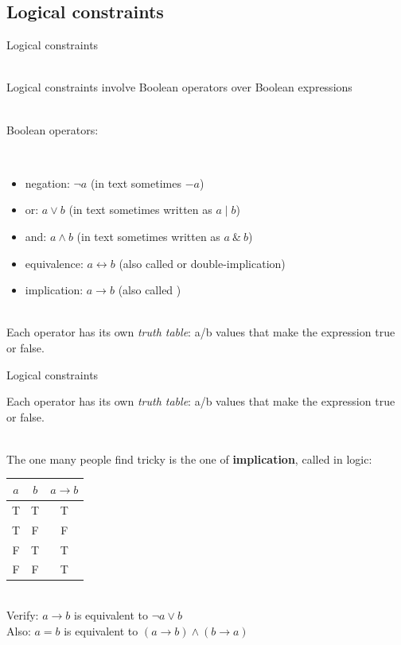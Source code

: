 \documentclass{cons-beamer}
\begin{document}
\subsection{Logical constraints}

\begin{frame}{Logical constraints}

  $ $\\
  Logical constraints involve Boolean operators over Boolean expressions

  $ $\\
  Boolean operators:

  $ $\\
  \begin{itemize}
    \item negation: $\neg a$ \quad(in text sometimes $-a$)
    \item or: $a \vee b$ \quad(in text sometimes written as $a\mid b$)
    \item and: $a \wedge b$ \quad(in text sometimes written as $a~\&~b$)
    \item equivalence: $a \leftrightarrow b$ \quad(also called  or double-implication)
    \item implication: $a \rightarrow b$ \quad(also called )
  \end{itemize}

  $ $\\
  Each operator has its own \textit{truth table}: a/b values that make the expression true or false.
\end{frame}

\begin{frame}{Logical constraints}

  Each operator has its own \textit{truth table}: a/b values that make the expression true or false.

  $ $\\
  The one many people find tricky is the one of \textbf{implication}, called  in logic:
  {%
  \begin{center}
  \begin{tabular}{|c|c|c|}
    \hline
    $a$ & $b$ & $a \rightarrow b$ \\
    \hline
    T & T & T \\
    T & F & F \\
    F & T & T \\
    F & F & T \\
    \hline
  \end{tabular}
  \end{center}
  }

  $ $\\
  Verify: $a \rightarrow b$ is equivalent to $\neg a \vee b$\\
  Also: $a = b$ is equivalent to $(a \rightarrow b) \wedge (b \rightarrow a)$

\end{frame}
\end{document}
